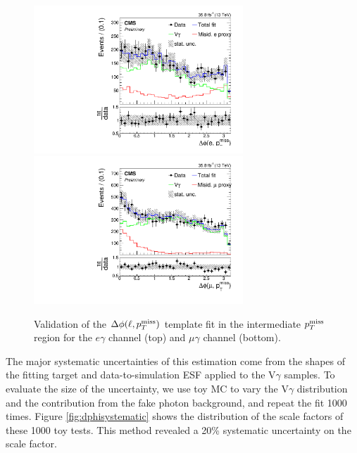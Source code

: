 \documentclass[thesis.tex]{subfiles}
\renewcommand\_{\textunderscore\allowbreak}
\begin{document}
\begin{figure}[hbtp]
  \centering
    \includegraphics[width=0.7\textwidth]{Fig/fit_dPhi_eg_MET120.pdf} \\
    \includegraphics[width=0.7\textwidth]{Fig/fit_dPhi_mg_MET120.pdf}
  \caption{Validation of the $\Delta\phi(\ell,p_T^\textrm{miss})$ template fit in the intermediate $p_T^\textrm{miss}$ region for the $e\gamma$ channel (top) and $\mu\gamma$ channel (bottom).}
    \label{fig:checkdPhi}
\end{figure}

The major systematic uncertainties of this estimation come from the shapes of the fitting target and data-to-simulation ESF applied to the V$\gamma$ samples. To evaluate the size of the uncertainty, we use toy MC to vary the V$\gamma$ distribution and the contribution from the fake photon background, and 
repeat the fit 1000 times. Figure \ref{fig:dphisystematic} shows the distribution of the scale factors of these 1000 toy tests. This method revealed a 20\% systematic uncertainty on the scale factor.
\end{document}
